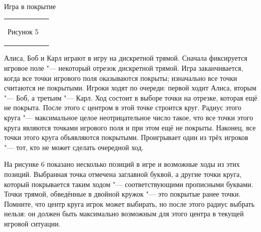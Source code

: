 \begin{problem}{Игра в покрытие}
\begin{tabular}{lr}
\begin{minipage}{0.27\thelinewidth}
\begin{center}
Рисунок 5
\end{center}
\end{minipage}
\end{tabular}

\newpage

Алиса, Боб и Карл играют в игру на дискретной трямой.
Сначала фиксируется игровое поле "--- некоторый отрезок дискретной трямой.
Игра заканчивается, когда все точки игрового поля оказываются покрыты;
изначально все точки считаются не покрытыми.
Игроки ходят по очереди: первой ходит Алиса, вторым "--- Боб,
а третьим "--- Карл.
Ход состоит в выборе точки на отрезке, которая ещё не покрыта.
После этого с центром в этой точке строится круг.
Радиус этого круга "--- максимальное целое неотрицательное число такое, что
все точки этого круга являются точками игрового поля и при этом ещё не покрыты.
Наконец, все точки этого круга объявляются покрытыми.
Проигрывает один из трёх игроков "--- тот, кто не может сделать очередной ход.

На рисунке 6 показано несколько позиций в игре и возможные ходы
из этих позиций.
Выбранная точка отмечена заглавной буквой, а другие точки круга,
который покрывается таким ходом "--- соответствующими прописными буквами.
Точки трямой, обведённые в двойной кружок "--- это покрытые ранее точки.
Помните, что центр круга игрок может выбирать, но после этого радиус
выбрать нельзя: он должен быть максимально возможным для этого центра
в текущей игровой ситуации.


\end{problem}
